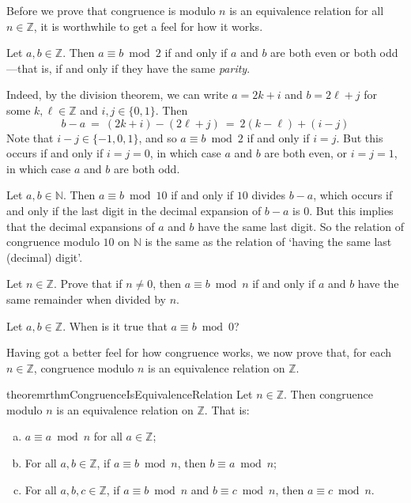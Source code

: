 Before we prove that congruence is modulo $n$ is an equivalence relation for all $n \in \mathbb{Z}$, it is worthwhile to get a feel for how it works.

\begin{example}
\label{exCongruenceModuloTwoIsSameAsParity}
Let $a,b \in \mathbb{Z}$. Then $a \equiv b \bmod 2$ if and only if $a$ and $b$ are both even or both odd---that is, if and only if they have the same \textit{parity}.

Indeed, by the division theorem, we can write $a=2k+i$ and $b=2\ell+j$ for some $k,\ell \in \mathbb{Z}$ and $i,j \in \{ 0,1 \}$. Then
\[ b - a ~=~ (2k+i) - (2\ell+j) ~=~ 2(k-\ell) + (i-j) \]
Note that $i-j \in \{ {-1},0,1 \}$, and so $a \equiv b \bmod 2$ if and only if $i=j$. But this occurs if and only if $i=j=0$, in which case $a$ and $b$ are both even, or $i=j=1$, in which case $a$ and $b$ are both odd.
\end{example}

\begin{example}
\label{exModuloTenIsSameAsLastDigit}
Let $a,b \in \mathbb{N}$. Then $a \equiv b \bmod{10}$ if and only if $10$ divides $b-a$, which occurs if and only if the last digit in the decimal expansion of $b-a$ is $0$. But this implies that the decimal expansions of $a$ and $b$ have the same last digit. So the relation of congruence modulo $10$ on $\mathbb{N}$ is the same as the relation of `having the same last (decimal) digit'.
\end{example}

\begin{exercise}
Let $n \in \mathbb{Z}$. Prove that if $n \ne 0$, then $a \equiv b \bmod n$ if and only if $a$ and $b$ have the same remainder when divided by $n$.
\end{exercise}

\begin{exercise}
Let $a,b \in \mathbb{Z}$. When is it true that $a \equiv b \bmod 0$?
\end{exercise}

Having got a better feel for how congruence works, we now prove that, for each $n \in \mathbb{Z}$, congruence modulo $n$ is an equivalence relation on $\mathbb{Z}$.

\begin{restatable}{theorem}{rthmCongruenceIsEquivalenceRelation}
\label{thmCongruenceIsEquivalenceRelation}
Let $n \in \mathbb{Z}$. Then congruence modulo $n$ is an equivalence relation on $\mathbb{Z}$. That is:
\begin{enumerate}[(a)]
\item $a \equiv a \bmod n$ for all $a \in \mathbb{Z}$;
\item For all $a,b \in \mathbb{Z}$, if $a \equiv b \bmod n$, then $b \equiv a \bmod n$;
\item For all $a,b,c \in \mathbb{Z}$, if $a \equiv b \bmod n$ and $b \equiv c \bmod n$, then $a \equiv c \bmod n$.
\end{enumerate}
\end{restatable}

